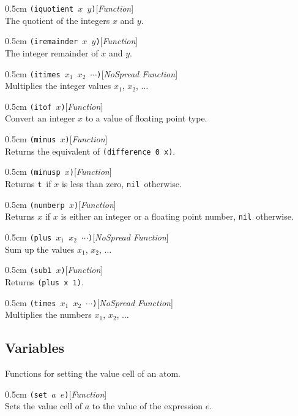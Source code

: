 \documentclass[a4paper]{article}
\newcommand{\lisp}[1]{\texttt{#1}}
\newcommand{\T}{\lisp{t}}
\newcommand{\NIL}{\lisp{nil}}
\newcommand{\xargs}{$x_{1}$ $x_{2}$ $\cdots$}
\newcommand{\largs}{$x_{1}$, $x_{2}$, $\ldots$}
\newenvironment{defun}[2]{\begin{adjustwidth}{0.5cm}{}
    {\hspace*{-0.5cm}\lisp{#2}\hfill[\textit{#1}]\\}}
               {\end{adjustwidth}}
\begin{document}
\begin{defun}{Function}{(iquotient $x$ $y$)}
  The quotient of the integers $x$ and $y$.
\end{defun}

\begin{defun}{Function}{(iremainder $x$ $y$)}
  The integer remainder of $x$ and $y$.
\end{defun}

\begin{defun}{NoSpread Function}{(itimes \xargs)}
  Multiplies the integer values \largs
\end{defun}

\begin{defun}{Function}{(itof $x$)}
  Convert an integer $x$ to a value of floating point type.
\end{defun}

\begin{defun}{Function}{(minus $x$)}
  Returns the equivalent of \lisp{(difference 0 x)}.
\end{defun}

\begin{defun}{Function}{(minusp $x$)}
  Returns \T\ if $x$ is less than zero, \NIL\ otherwise.
\end{defun}

\begin{defun}{Function}{(numberp $x$)}
  Returns $x$ if $x$ is either an integer or a floating point number,
  \NIL\ otherwise.
\end{defun}

\begin{defun}{NoSpread Function}{(plus \xargs)}
  Sum up the values \largs
\end{defun}

\begin{defun}{Function}{(sub1 $x$)}
  Returns \lisp{(plus x 1)}.
\end{defun}

\begin{defun}{NoSpread Function}{(times \xargs)}
  Multiplies the numbers \largs
\end{defun}

\subsection{Variables}
Functions for setting the value cell of an atom.

\begin{defun}{Function}{(set $a$ $e$)}
  Sets the value cell of $a$ to the value of the expression $e$.
\end{defun}
\end{document}

